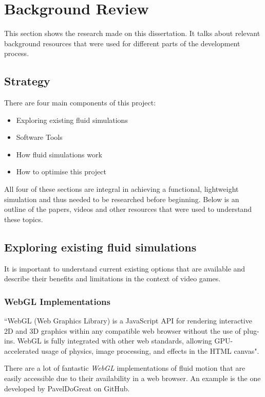 \documentclass[12pt]{article}
\begin{document}
    \section{Background Review}
    This section shows the research made on this dissertation. It talks about relevant background resources that were used for different parts of the development process.
    
    \subsection{Strategy}
    There are four main components of this project:
    \begin{itemize}
        \item Exploring existing fluid simulations
        \item Software Tools
        \item How fluid simulations work
        \item How to optimise this project
    \end{itemize}
    \sloppy
    All four of these sections are integral in achieving a functional, lightweight simulation and thus needed to be researched before beginning. Below is an outline of the papers, videos and other resources that were used to understand these topics.

    \subsection{Exploring existing fluid simulations}
    It is important to understand current existing options that are available and describe their benefits and limitations in the context of video games.

    \subsubsection{WebGL Implementations}

    ``WebGL (Web Graphics Library) is a JavaScript API for rendering interactive 2D and 3D graphics within any compatible web browser without the use of plug-ins. WebGL is fully integrated with other web standards, allowing GPU-accelerated usage of physics, image processing, and effects in the HTML canvas".\cite{webglwikipedia}

    There are a lot of fantastic \textit{WebGL} implementations of fluid motion that are easily accessible due to their availability in a web browser. An example is the one developed by PavelDoGreat on GitHub.
\end{document}
